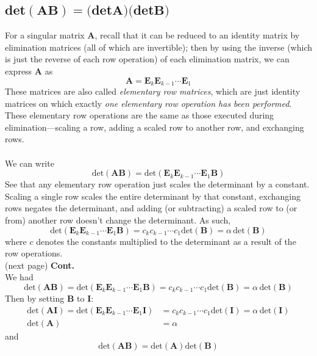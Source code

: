 \documentclass{report}
\begin{document}
\subsection{det$(\bm{AB})=($det$\bm A)($det$\bm B)$}
For a singular matrix $\bm A$, recall that it can be reduced to an identity matrix by elimination matrices (all of which are invertible); 
then by using the inverse (which is just the reverse of each row operation) of each elimination matrix, we can express $\bm A$ as 
\begin{equation*}
\bm A=\bm{E}_k\bm{E}_{k-1}\cdots\bm{E}_{1}
\end{equation*} 
These matrices are also called \textit{elementary row matrices}, which are just identity matrices on which exactly \textit{one elementary row operation has been performed}. 
These elementary row operations are the same as those executed during elimination---scaling a row, adding a scaled row to another row, and exchanging rows.\\
\vspace{1mm}\\
We can write
\begin{equation*}
\text{det}(\bm{AB})=\text{det}(\bm{E}_k\bm{E}_{k-1}\cdots\bm{E}_{1}\bm B)
\end{equation*}
See that any elementary row operation just scales the determinant by a constant. Scaling a single row scales the entire determinant by that constant, 
exchanging rows negates the 
determinant, and adding (or subtracting) a scaled row to (or from) another row doesn't change the determinant. As such,
\begin{equation*}
\text{det}(\bm{E}_k\bm{E}_{k-1}\cdots\bm{E}_{1}\bm B)=c_kc_{k-1}\cdots c_1\text{det}(\bm B)=\alpha\,\text{det}(\bm B)
\end{equation*}
where $c$ denotes the constants multiplied to the determinant as a result of the row operations.\\
(next page)\newpage
\noindent\textbf{Cont.}\\
We had
\begin{equation*}
\text{det}(\bm{AB})=\text{det}(\bm{E}_k\bm{E}_{k-1}\cdots\bm{E}_{1}\bm B)=c_kc_{k-1}\cdots c_1\text{det}(\bm B)=\alpha\,\text{det}(\bm B)
\end{equation*}
Then by setting $\bm B$ to $\bm I$:
\begin{align*}
\text{det}(\bm{AI})=\text{det}(\bm{E}_k\bm{E}_{k-1}\cdots\bm{E}_{1}\bm I)&=c_kc_{k-1}\cdots c_1\text{det}(\bm I)=\alpha\,\text{det}(\bm I)\\
\text{det}(\bm A)&=\alpha
\end{align*}
and
\begin{equation*}
\text{det}(\bm{AB})=\text{det}(\bm A)\text{det}(\bm B)
\end{equation*}
\end{document}
